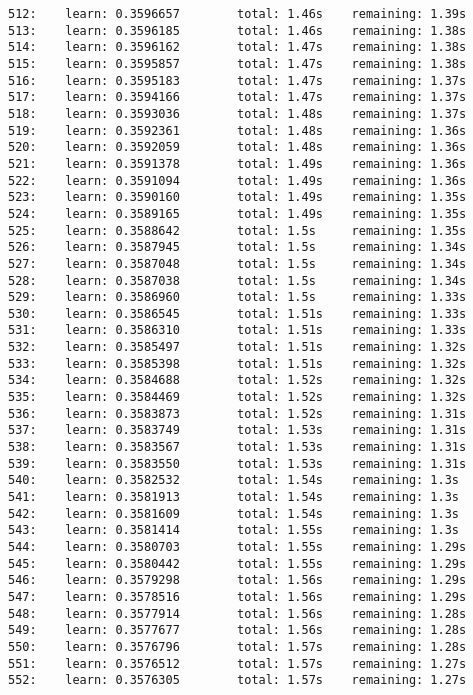\documentclass[11pt]{article}
\begin{document}
\begin{Verbatim}[commandchars=\\\{\}]
512:    learn: 0.3596657        total: 1.46s    remaining: 1.39s
513:    learn: 0.3596185        total: 1.46s    remaining: 1.38s
514:    learn: 0.3596162        total: 1.47s    remaining: 1.38s
515:    learn: 0.3595857        total: 1.47s    remaining: 1.38s
516:    learn: 0.3595183        total: 1.47s    remaining: 1.37s
517:    learn: 0.3594166        total: 1.47s    remaining: 1.37s
518:    learn: 0.3593036        total: 1.48s    remaining: 1.37s
519:    learn: 0.3592361        total: 1.48s    remaining: 1.36s
520:    learn: 0.3592059        total: 1.48s    remaining: 1.36s
521:    learn: 0.3591378        total: 1.49s    remaining: 1.36s
522:    learn: 0.3591094        total: 1.49s    remaining: 1.36s
523:    learn: 0.3590160        total: 1.49s    remaining: 1.35s
524:    learn: 0.3589165        total: 1.49s    remaining: 1.35s
525:    learn: 0.3588642        total: 1.5s     remaining: 1.35s
526:    learn: 0.3587945        total: 1.5s     remaining: 1.34s
527:    learn: 0.3587048        total: 1.5s     remaining: 1.34s
528:    learn: 0.3587038        total: 1.5s     remaining: 1.34s
529:    learn: 0.3586960        total: 1.5s     remaining: 1.33s
530:    learn: 0.3586545        total: 1.51s    remaining: 1.33s
531:    learn: 0.3586310        total: 1.51s    remaining: 1.33s
532:    learn: 0.3585497        total: 1.51s    remaining: 1.32s
533:    learn: 0.3585398        total: 1.51s    remaining: 1.32s
534:    learn: 0.3584688        total: 1.52s    remaining: 1.32s
535:    learn: 0.3584469        total: 1.52s    remaining: 1.32s
536:    learn: 0.3583873        total: 1.52s    remaining: 1.31s
537:    learn: 0.3583749        total: 1.53s    remaining: 1.31s
538:    learn: 0.3583567        total: 1.53s    remaining: 1.31s
539:    learn: 0.3583550        total: 1.53s    remaining: 1.31s
540:    learn: 0.3582532        total: 1.54s    remaining: 1.3s
541:    learn: 0.3581913        total: 1.54s    remaining: 1.3s
542:    learn: 0.3581609        total: 1.54s    remaining: 1.3s
543:    learn: 0.3581414        total: 1.55s    remaining: 1.3s
544:    learn: 0.3580703        total: 1.55s    remaining: 1.29s
545:    learn: 0.3580442        total: 1.55s    remaining: 1.29s
546:    learn: 0.3579298        total: 1.56s    remaining: 1.29s
547:    learn: 0.3578516        total: 1.56s    remaining: 1.29s
548:    learn: 0.3577914        total: 1.56s    remaining: 1.28s
549:    learn: 0.3577677        total: 1.56s    remaining: 1.28s
550:    learn: 0.3576796        total: 1.57s    remaining: 1.28s
551:    learn: 0.3576512        total: 1.57s    remaining: 1.27s
552:    learn: 0.3576305        total: 1.57s    remaining: 1.27s

\end{Verbatim}
\end{document}
